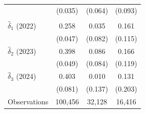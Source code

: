 \begin{tabular}{l*{3}{c}}
            &     (0.035)         &     (0.064)         &     (0.093)         \\
\addlinespace
\addlinespace&                     &                     &                     \\
\addlinespace
$\hat{\delta}_1$ (2022)&       0.258\sym{***}&       0.035         &       0.161         \\
            &     (0.047)         &     (0.082)         &     (0.115)         \\
\addlinespace
$\hat{\delta}_2$ (2023)&       0.398\sym{***}&       0.086         &       0.166         \\
            &     (0.049)         &     (0.084)         &     (0.119)         \\
\addlinespace
$\hat{\delta}_3$ (2024)&       0.403\sym{***}&       0.010         &       0.131         \\
            &     (0.081)         &     (0.137)         &     (0.203)         \\
\midrule
Observations&     100,456         &      32,128         &      16,416         \\
\bottomrule \end{tabular}
